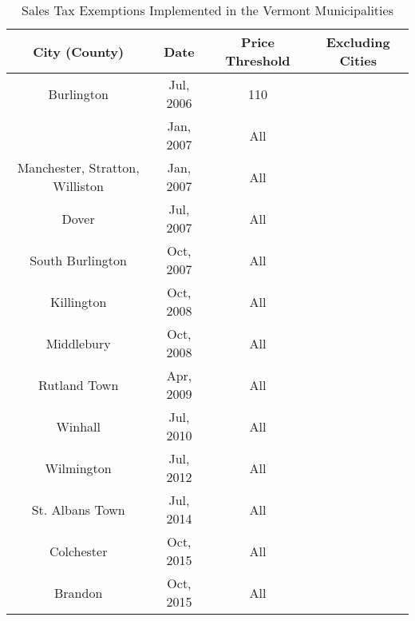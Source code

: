 \documentclass[12pt]{article}
\begin{document}
\begin{table}
	\caption{Sales Tax Exemptions Implemented in the Vermont Municipalities}
	\label{table:vmun}
	\centering
	\begin{tabular}{|c|c|c|c|}
		\hline 
		City (County)	& Date   & Price Threshold & Excluding Cities   \\ 
		\hline 
		Burlington				& Jul, 2006  &  110   & \\
								& Jan, 2007  &  All   & \\
		Manchester, Stratton, Williston	
								& Jan, 2007  &  All   &  \\ 
		Dover					& Jul, 2007  &  All   & \\						
		South Burlington		& Oct, 2007  &  All   & \\
		Killington				& Oct, 2008  &  All   & \\
		Middlebury				& Oct, 2008  &  All   & \\
		Rutland Town			& Apr, 2009  &  All   & \\
		Winhall					& Jul, 2010  &  All   & \\
		Wilmington				& Jul, 2012  &  All   & \\ 
		St. Albans Town			& Jul, 2014  &  All   & \\
		Colchester				& Oct, 2015  &  All   & \\
		Brandon					& Oct, 2015  &  All   & \\ \hline
							
	\end{tabular} 
\end{table}	
\end{document}
